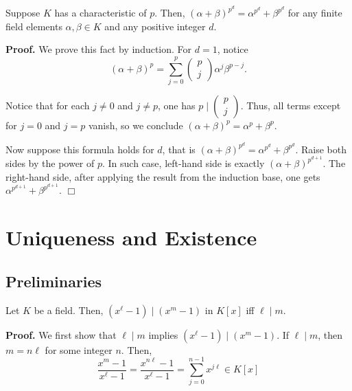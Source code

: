 \documentclass{template}
\newcommand{\qedwhite}{\hfill \ensuremath{\Box}}
\begin{document}
\begin{proposition}\label{proposition:freshman-dream}
    Suppose $K$ has a characteristic of $p$. Then,
    $(\alpha+\beta)^{p^d}=\alpha^{p^d} + \beta^{p^d}$ for any finite field
    elements $\alpha,\beta \in K$ and any positive integer $d$.
\end{proposition}

\textbf{Proof.} We prove this fact by induction. For $d=1$, notice
\begin{equation*}
    (\alpha+\beta)^p = \sum_{j=0}^p \begin{pmatrix}
        p \\ j
    \end{pmatrix}\alpha^j\beta^{p-j}.
\end{equation*}

Notice that for each $j \neq 0$ and $j \neq p$, one has $p \mid \left(\begin{smallmatrix}
p \\ j \end{smallmatrix}\right)$. Thus, all terms except for $j=0$ and $j=p$ vanish, 
so we conclude $(\alpha+\beta)^p = \alpha^p + \beta^p$.

Now suppose this formula holds for $d$, that is
$(\alpha+\beta)^{p^d}=\alpha^{p^d} + \beta^{p^d}$. Raise both sides by the power
of $p$. In such case, left-hand side is exactly $(\alpha+\beta)^{p^{d+1}}$. The
right-hand side, after applying the result from the induction base, one gets
$\alpha^{p^{d+1}}+\beta^{p^{d+1}}$.
\qedwhite

\section{Uniqueness and Existence}\label{section:proving}

\subsection{Preliminaries}

\begin{proposition}\label{proposition:ell-m}
    Let $K$ be a field. Then, $(x^{\ell}-1) \mid (x^m-1)$ in $K[x]$ iff
    $\ell \mid m$.
\end{proposition}

\textbf{Proof.} We first show that $\ell \mid m$ implies $(x^{\ell}-1) \mid
(x^m-1)$. If $\ell \mid m$, then $m=n\ell$ for some integer $n$. Then,
\begin{equation*}
    \frac{x^m-1}{x^{\ell}-1} = \frac{x^{n\ell}-1}{x^{\ell}-1} = \sum_{j=0}^{n-1}x^{j\ell} \in K[x]
\end{equation*}
\end{document}
